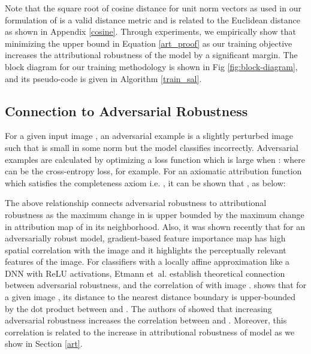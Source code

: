 \documentclass[runningheads]{llncs}
\def\etal{et~al.}
\begin{document}
Note that the square root of cosine distance for unit  norm vectors as used in our formulation of  is a valid distance metric and is related to the Euclidean distance as shown in Appendix \ref{cosine}. Through experiments, we empirically show that minimizing the upper bound in Equation \ref{art_proof} as our training objective increases the attributional robustness of the model by a significant margin. The block diagram for our training methodology is shown in Fig \ref{fig:block-diagram}, and its pseudo-code is given in Algorithm \ref{train_sal}.


\subsection{Connection to Adversarial Robustness}\label{connection}
For a given input image , an adversarial example is a slightly perturbed image  such that  is small in some norm but the model  classifies  incorrectly. Adversarial examples are calculated by optimizing a loss function  which is large when :
\label{xadv}
\noindent where  can be the cross-entropy loss, for example. For an axiomatic attribution function  which satisfies the completeness axiom 
i.e. , it can be shown that , as below:   
 

The above relationship connects adversarial robustness to attributional robustness as the maximum change in  is upper bounded by the maximum change in attribution map of  in its  neighborhood. Also, it was shown \cite{odds_madry} recently that for an adversarially robust model, gradient-based feature importance map  has high spatial correlation with the image  and it highlights the perceptually relevant features of the image. For classifiers with a locally affine approximation like a DNN with ReLU activations, Etmann \etal \cite{icml_theory_sal} establish theoretical connection between adversarial robustness, and the correlation of  with image . \cite{icml_theory_sal} shows that for a given image , its distance to the nearest distance boundary is upper-bounded by the dot product between  and . The authors of \cite{icml_theory_sal} showed that increasing adversarial robustness increases the correlation between  and . Moreover, this correlation is related to the increase in attributional robustness of model as we show in Section \ref{art}.
\end{document}
